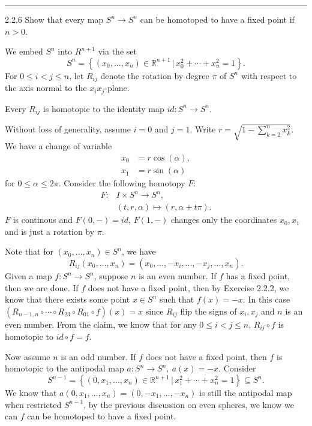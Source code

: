 \documentclass[a4paper, 12pt]{article}
\begin{document}
\noindent\rule{7in}{2.8pt}
\begin{problem}{2.2.6}
Show that every map \(S^n\rightarrow S^n\) can be homotoped to have a fixed point if \(n>0\).
\end{problem}
\begin{solution}
We embed \(S^n\) into \(R^{n+1}\) via the set 
\[S^n=\left\{ (x_0,\ldots,x_n)\in \mathbb{R}^{n+1}\,|\, x_0^2+\cdots+x_n^2=1 \right\}.\]
For \(0\leq i<j\leq n\), let \(R_{ij}\) denote the rotation by degree \(\pi\) of \(S^n\) with respect to the axis normal to the \(x_ix_j\)-plane.

\begin{claim}
Every \(R_{ij}\) is homotopic to the identity map \(id:S^n\rightarrow S^n\).
\end{claim}
\begin{claimproof}
Without loss of generality, assume \(i=0\) and \(j=1\). Write \(r=\sqrt{1-\sum_{k=2}^{n} x_k^2}\). We have a change of variable
\begin{align*}
    x_0& =r\cos (\alpha),\\ 
    x_1& =r\sin (\alpha)
\end{align*}
for \(0\leq \alpha\leq 2\pi\). Consider the following homotopy \(F\):
\begin{align*}
    F:&I\times S^n\rightarrow S^n,\\ 
    &(t,r,\alpha)\mapsto (r,\alpha+t\pi).
\end{align*}
\(F\) is continous and \(F(0,-)=id\), \(F(1,-)\) changes only the coordinates \(x_0,x_1\) and is just a rotation by \(\pi\).
\end{claimproof}

Note that for \((x_0,\ldots,x_n)\in S^n\), we have 
\[R_{ij}(x_0,\ldots,x_n)=(x_0,\ldots,-x_i,\ldots,-x_j,\ldots,x_n).\]
Given a map \(f:S^n\rightarrow S^n\), suppose \(n\) is an even number. If \(f\) has a fixed point, then we are done. If \(f\) does not have a fixed point, then by Exercise 2.2.2, we know that there exists some point 
\(x\in S^n\) such that \(f(x)=-x\). In this case \((R_{n-1,n}\circ \cdots\circ R_{23}\circ R_{01}\circ f)(x)=x\) since \(R_{ij}\) flip the signs of \(x_i,x_j\) and \(n\) is an even number. From the claim, we know that 
for any \(0\leq i<j\leq n\), \(R_{ij}\circ f\) is homotopic to \(id\circ f=f\).

Now assume \(n\) is an odd number. If \(f\) does not have a fixed point, then \(f\) is homotopic to the antipodal map \(a:S^n\rightarrow S^n,\  a(x)=-x\). Consider 
\[S^{n-1}=\left\{ (0,x_1,\ldots,x_n)\in \mathbb{R}^{n+1}\,|\, x_1^2+\cdots+x_n^2=1 \right\}\subseteq S^n.\]
We know that \(a(0,x_1,\ldots,x_n)=(0,-x_1,\ldots,-x_n)\) is still the antipodal map when restricted \(S^{n-1}\), by the previous discussion on even spheres, we know we can \(f\) can be homotoped to have a fixed point.
\end{solution}
\end{document}
